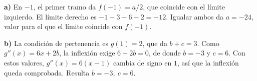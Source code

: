 \textbf{a)} En $-1$, el primer tramo da $f(-1)=a/2$,
que coincide con el límite izquierdo. El límite derecho
es $-1-3-6-2=-12$. Igualar ambos da $\boxed{a=-24}$,
valor para el que el límite coincide con $f(-1)$.

\textbf{b)} La condición de pertenencia es $g(1)=2$, que da
$b+c=3$. Como $g''(x)=6x+2b$, la inflexión exige $6+2b=0$,
de donde $b=-3$ y $c=6$. Con estos valores,
$g''(x)=6(x-1)$ cambia de signo en $1$, así que la inflexión
queda comprobada. Resulta $\boxed{b=-3,\ c=6}$.
